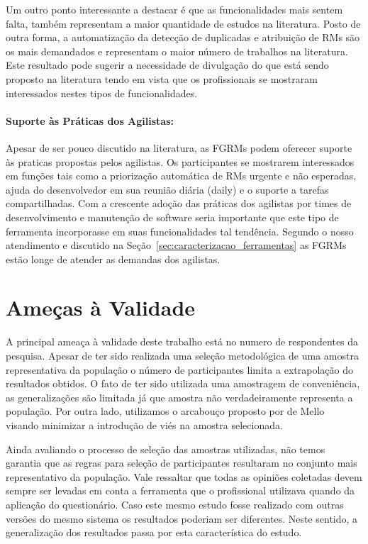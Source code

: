 Um outro ponto interessante a destacar é que as funcionalidades mais sentem
falta, também representam a maior quantidade de estudos na literatura. Posto de
outra forma, a automatização da detecção de duplicadas e atribuição de RMs são
os mais demandados e representam o maior número de trabalhos na literatura. Este
resultado pode sugerir a necessidade de divulgação do que está sendo proposto na
literatura tendo em vista que os profissionais se mostraram interessados nestes
tipos de funcionalidades.

\paragraph{Suporte às Práticas dos Agilistas:}
\label{par:pesq_profissionais_suporte_pratica_agilistas}

Apesar de ser pouco discutido na literatura, as FGRMs podem oferecer suporte às
praticas propostas pelos agilistas. Os participantes se mostrarem interessados
em funções tais como a priorização automática de RMs urgente e não esperadas,
ajuda do desenvolvedor em sua reunião diária (daily) e o suporte a tarefas
compartilhadas. Com a crescente adoção das práticas dos agilistas por times de
desenvolvimento e manutenção de software seria importante que este tipo de
ferramenta incorporasse em suas funcionalidades tal tendência. Segundo o nosso
atendimento e discutido na Seção~\ref{sec:caracterizacao_ferramentas} as FGRMs
estão longe de atender as demandas dos agilistas.

\section{Ameças à Validade}
\label{sec:pesquisa_profissionais_ameacas_validade}

A principal ameaça à validade deste trabalho está no numero de respondentes da
pesquisa. Apesar de ter sido realizada uma seleção metodológica de uma amostra
representativa da população o número de participantes limita a extrapolação do
resultados obtidos. O fato de ter sido utilizada uma amostragem de conveniência,
as generalizações são limitada já que amostra não verdadeiramente representa a
população. Por outra lado, utilizamos o arcabouço proposto por de
Mello~\cite{de2014towards} visando minimizar a introdução de viés na amostra
selecionada.

Ainda avaliando o processo de seleção das amostras utilizadas, não temos
garantia que as regras para seleção de participantes resultaram no conjunto mais
representativo da população. Vale ressaltar que todas as opiniões coletadas
devem sempre ser levadas em conta a ferramenta que o profissional utilizava
quando da aplicação do questionário.  Caso este mesmo estudo fosse realizado com
outras versões do mesmo sistema os resultados poderiam ser diferentes. Neste
sentido, a generalização dos resultados passa por esta característica do estudo.

